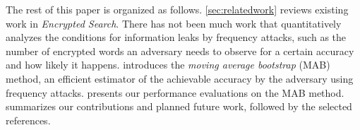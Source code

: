 \documentclass[ ../main.tex]{subfiles}
\begin{document}
The rest of this paper is organized as follows. \cref{sec:relatedwork} reviews existing work in \emph{Encrypted Search}. There has not been much work that quantitatively analyzes the conditions for information leaks by frequency attacks, such as the number of encrypted words an adversary needs to observe for a certain accuracy and how likely it happens.  introduces the \emph{moving average bootstrap} (MAB) method, an efficient estimator of the achievable accuracy by the adversary using frequency attacks.  presents our performance evaluations on the MAB method.  summarizes our contributions and planned future work, followed by the selected references.
\end{document}
